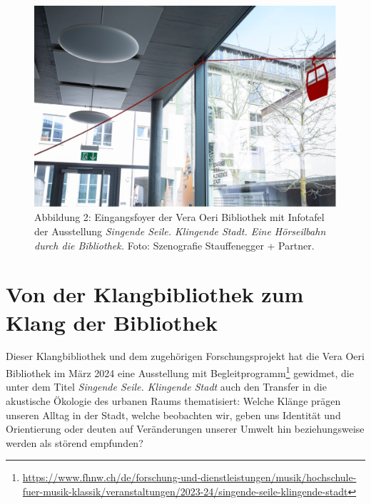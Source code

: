 \documentclass[a4paper,
fontsize=11pt,
oneside,
numbers=noperiodatend,
parskip=half-,
bibliography=totoc,
final
]{scrartcl}
\begin{document}
\begin{figure}
\centering
\includegraphics{img/Abb2.jpg}
\caption{Abbildung 2: Eingangsfoyer der Vera Oeri Bibliothek mit
Infotafel der Ausstellung \emph{Singende Seile. Klingende Stadt. Eine
Hörseilbahn durch die Bibliothek.} Foto: Szenografie Stauffenegger +
Partner.}
\end{figure}

\hypertarget{von-der-klangbibliothek-zum-klang-der-bibliothek}{%
\section{Von der Klangbibliothek zum Klang der
Bibliothek}\label{von-der-klangbibliothek-zum-klang-der-bibliothek}}

Dieser Klangbibliothek und dem zugehörigen Forschungsprojekt hat die
Vera Oeri Bibliothek im März 2024 eine Ausstellung mit
Begleitprogramm\footnote{\url{https://www.fhnw.ch/de/forschung-und-dienstleistungen/musik/hochschule-fuer-musik-klassik/veranstaltungen/2023-24/singende-seile-klingende-stadt}}
gewidmet, die unter dem Titel \emph{Singende Seile. Klingende Stadt}
auch den Transfer in die akustische Ökologie des urbanen Raums
thematisiert: Welche Klänge prägen unseren Alltag in der Stadt, welche
beobachten wir, geben uns Identität und Orientierung oder deuten auf
Veränderungen unserer Umwelt hin beziehungsweise werden als störend
empfunden?
\end{document}
